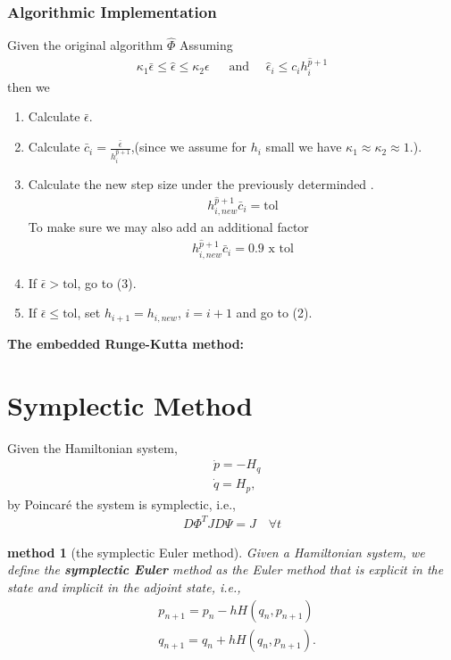 \documentclass[a4paper,12pt,oneside,fleqn]{book}
\newtheorem{method}[theorem]{method}
\theoremstyle{definition}
\theoremstyle{remark}
\begin{document}
\subsubsection{Algorithmic Implementation}
Given the original algorithm $\hat{\Phi}$ Assuming
\begin{align*}
	\kappa_1 \bar{\epsilon} \le \hat{\epsilon} \le \kappa_2 \epsilon\ \quad \text{ and } \quad
	\hat{\epsilon}_i \le c_i h_i^{\hat{p} + 1}
\end{align*}
then we 
\begin{enumerate}
	\item Calculate $\bar{\epsilon}$. 
	\item Calculate $\bar{c}_i = \frac{\bar{\epsilon}}{h_i^{\hat{p} + 1}}$,(since we assume for $h_i$ small we have $\kappa_1 \approx \kappa_2 \approx 1$.).
	\item Calculate the new step size under the previously determinded . 
	\begin{align*}
		h_{i,new}^{\hat{p} + 1} \bar{c}_i = \text{tol}
	\end{align*}
	To make sure we may also add an additional factor
	\begin{align*}
		h_{i,new}^{\hat{p} + 1} \bar{c}_i =  \text{0.9 x tol}
	\end{align*}
	\item If $\bar{\epsilon} > \text{tol}$, go to (3). 
	\item If $\bar{\epsilon} \le \text{tol}$, set $h_{i +1} = h_{i, new}$, $i = i +1$ and go to (2).
\end{enumerate}

\textbf{The embedded Runge-Kutta method:}





\section{Symplectic Method}
Given the Hamiltonian system, 
\begin{align*}
	&\dot{p} = - H_q \\
	&\dot{q} = H_p,
\end{align*}
by Poincar\'e the system is symplectic, i.e., 
\begin{align*}
	D\Phi^T J D\Psi = J \quad \forall t
\end{align*}

\begin{method}[the symplectic Euler method]
	Given a Hamiltonian system, we define the \textbf{symplectic Euler} method as the Euler method that is explicit in the state and implicit in the adjoint state, i.e., 
	\begin{align*}
		&p_{n + 1} = p_n - h H(q_n, p_{n + 1})\\
		&q_{n + 1} = q_n + h H(q_n, p_{n + 1}). 
	\end{align*}
\end{method}
\end{document}
